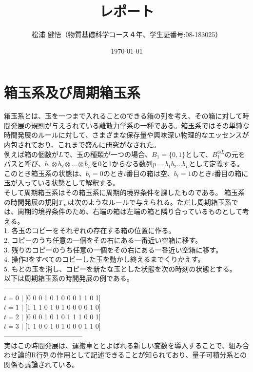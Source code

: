 \documentclass{jsreport}
\begin{document}
\title{レポート}
\author{松浦 健悟（物質基礎科学コース４年、学生証番号:08-183025）}
\date{\today}
\maketitle
\thispagestyle{empty}
\section{箱玉系及び周期箱玉系}
箱玉系とは、玉を一つまで入れることのできる箱の列を考え、その箱に対して時間発展の規則が与えられている離散力学系の一種である。箱玉系ではその単純な時間発展のルールに対して、さまざまな保存量や興味深い物理的なエッセンスが内包されており、これまで盛んに研究がなされた。\\
例えば箱の個数が$L$で、玉の種類が一つの場合、$B_1 = \{ 0, 1\}$として、$B_1 ^ {\otimes L}$の元をパスと呼び、$b_1 \otimes b_2 \otimes ... \otimes b_L $を0と1からなる数列$p = b_1 b_2 ... b_L $として定義する。このとき箱玉系の状態は、$b_i = 0$のとき$i$番目の箱は空、$b_i = 1$のとき$i$番目の箱に玉が入っている状態として解釈する。\\そして周期箱玉系はその箱玉系に周期的境界条件を課したものである。
箱玉系の時間発展の規則$T_\infty$は次のようなルールで与えられる。ただし周期箱玉系では、周期的境界条件のため、右端の箱は左端の箱と隣り合っているものとして考える。\\
1. 各玉のコピーをそれぞれの存在する箱の位置に作る。\\  
2. コピーのうち任意の一個をその右にある一番近い空箱に移す。\\  
3. 残りのコピーのうち任意の一個をその右にある一番近い空箱に移す。\\  
4. 操作3をすべてのコピーした玉を動かし終えるまでくりかえす。\\  
5. もとの玉を消し、コピーを新たな玉とした状態を次の時刻の状態とする。\\  
以下は周期箱玉系の時間発展の例である。\\  
-----------------------------------\\  
$t = 0$ $|$ [0 0 0 1 0 1 0 0 0 1 1 0 1]\\  
$t = 1$ $|$ [1 1 1 0 1 0 1 0 0 0 0 1 0]\\
$t = 2$ $|$ [0 0 0 1 0 1 0 1 1 1 0 0 1]\\
$t = 3$ $|$ [1 1 0 0 1 0 1 0 0 0 1 1 0]\\
-----------------------------------\\
実はこの時間発展は、運搬車ととよばれる新しい変数を導入することで、組み合わせ論的R行列の作用として記述できることが知られており、量子可積分系との関係も議論されている。
\end{document}
